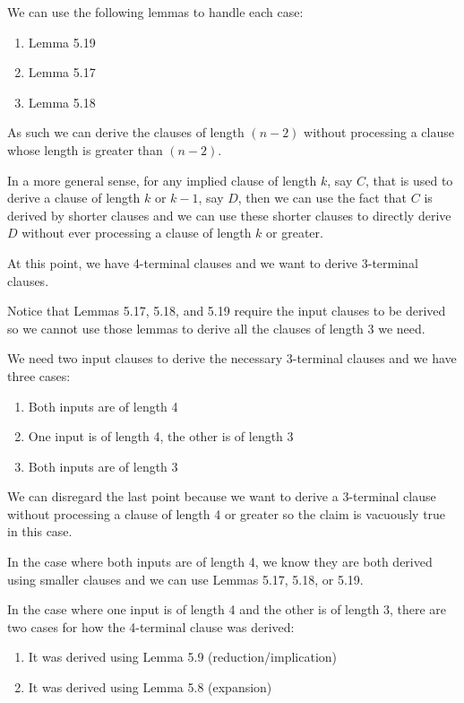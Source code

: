 \documentclass[manuscript]{acmart}
\begin{document}
    We can use the following lemmas to handle each case:

    \begin{enumerate}
        \item Lemma 5.19
        \item Lemma 5.17
        \item Lemma 5.18
    \end{enumerate}

    As such we can derive the clauses of length $(n - 2)$ without processing a clause whose length is greater than $(n - 2)$.

    In a more general sense, for any implied clause of length $k$, say $C$, that is used to derive a clause of length $k$ or $k - 1$, say $D$, then we can use the fact that $C$ is derived by shorter clauses and we can use these shorter clauses to directly derive $D$ without ever processing a clause of length $k$ or greater.

    At this point, we have 4-terminal clauses and we want to derive 3-terminal clauses. 
    
    Notice that Lemmas 5.17, 5.18, and 5.19 require the input clauses to be derived so we cannot use those lemmas to derive all the clauses of length 3 we need.

    We need two input clauses to derive the necessary 3-terminal clauses and we have three cases:

    \begin{enumerate}
        \item Both inputs are of length 4
        \item One input is of length 4, the other is of length 3
        \item Both inputs are of length 3
    \end{enumerate}

    We can disregard the last point because we want to derive a 3-terminal clause without processing a clause of length 4 or greater so the claim is vacuously true in this case.

    In the case where both inputs are of length 4, we know they are both derived using smaller clauses and we can use Lemmas 5.17, 5.18, or 5.19.

    In the case where one input is of length 4 and the other is of length 3, there are two cases for how the 4-terminal clause was derived:

    \begin{enumerate}
        \item It was derived using Lemma 5.9 (reduction/implication)
        \item It was derived using Lemma 5.8 (expansion)
    \end{enumerate}
\end{document}
